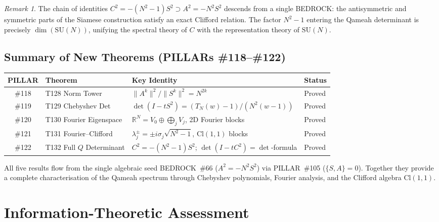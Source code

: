 \documentclass[aps,prd,twocolumn,superscriptaddress,floatfix,nofootinbib]{revtex4-2}
\theoremstyle{definition}
\theoremstyle{remark}
\newtheorem{remark}[theorem]{Remark}
\begin{document}
\begin{remark}
  The chain of identities $C^2 = -(N^2-1)S^2 \supset A^2 = -N^2 S^2$
  descends from a single BEDROCK: the antisymmetric and symmetric parts of the
  Siamese construction satisfy an exact Clifford relation.  The factor $N^2-1$
  entering the Qameah determinant is precisely $\dim(\mathrm{SU}(N))$, unifying
  the spectral theory of $C$ with the representation theory of $\mathrm{SU}(N)$.
\end{remark}

\subsection*{Summary of New Theorems (PILLARs \#118--\#122)}

\begin{center}
\begin{tabular}{clll}
\toprule
PILLAR & Theorem & Key Identity & Status \\
\midrule
\#118 & T128 Norm Tower
  & $\|A^k\|^2/\|S^k\|^2 = N^{2k}$
  & Proved \\
\#119 & T129 Chebyshev Det
  & $\det(I-tS^2)=(T_N(w)-1)/(N^2(w-1))$
  & Proved \\
\#120 & T130 Fourier Eigenspace
  & $\mathbb{R}^N = V_0 \oplus \bigoplus_j V_j$, 2D Fourier blocks
  & Proved \\
\#121 & T131 Fourier--Clifford
  & $\lambda_j^\pm = \pm i\sigma_j\sqrt{N^2-1}$, Cl$(1,1)$ blocks
  & Proved \\
\#122 & T132 Full $Q$ Determinant
  & $C^2=-(N^2-1)S^2$; $\det(I-tC^2)=\det$-formula
  & Proved \\
\bottomrule
\end{tabular}
\end{center}

\noindent
All five results flow from the single algebraic seed BEDROCK~\#66
($A^2 = -N^2 S^2$) via PILLAR~\#105 ($\{S,A\}=0$).  Together they provide a
complete characterisation of the Qameah spectrum through Chebyshev polynomials,
Fourier analysis, and the Clifford algebra $\mathrm{Cl}(1,1)$.

\section{Information-Theoretic Assessment}
\label{sec:kolmogorov}
\end{document}
